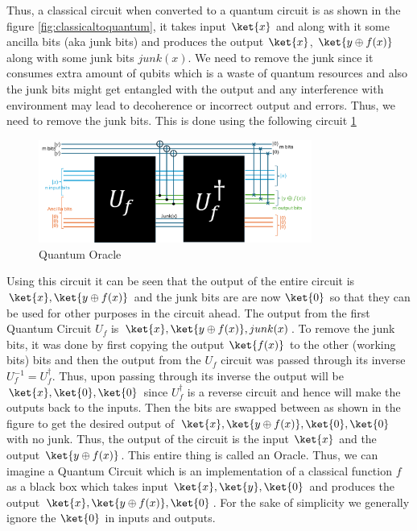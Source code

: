\documentclass[12pt, oneside]{book}
\theoremstyle{definition}
\theoremstyle{definition}
\theoremstyle{remark}
\begin{document}
Thus, a classical circuit when converted to a quantum circuit is as shown in the figure \ref{fig:classicaltoquantum}, it takes input $\ket{x}$ and along with it 
some ancilla bits (aka junk bits) and produces the output $\ket{x}$, $\ket{y \oplus f(x)}$ along with some junk bits $junk(x)$. We need to remove the junk since it consumes extra amount of qubits which is a waste of quantum resources and 
also the junk bits might get entangled with the output and any interference with environment may lead to decoherence or incorrect output and errors. Thus, we need to remove the junk bits.
This is done using the following circuit \ref{fig:quantumoracle}
\begin{figure}[H]
    \centering
    \includegraphics[width=0.8\textwidth]{../images/quantumoracle.png}
    \caption{Quantum Oracle}
    \label{fig:quantumoracle}
\end{figure}
Using this circuit it can be seen that the output of the entire circuit is $\ket{x},\ket{y\oplus f(x)}$ and the junk bits are are now $\ket{0}$ so that they can be used for other purposes in the circuit ahead. 
The output from the first Quantum Circuit $U_f$ is $\ket{x},\ket{y\oplus f(x)},junk(x)$. To remove the junk bits, it was done by first copying the output $\ket{f(x)}$ to the other (working bits) bits and then the output from the $U_f$ circuit was passed through its inverse $U_f^{-1}=U^{\dagger}_f$. Thus, upon passing through its inverse the output will be $\ket{x},\ket{0},\ket{0}$ since $U_f^{\dagger}$ is a reverse circuit and hence will make the outputs back to the inputs. 
Then the bits are swapped between as shown in the figure to get the desired output of 
$\ket{x},\ket{y\oplus f(x)},\ket{0},\ket{0}$ with no junk. Thus, the output of the circuit is the input $\ket{x}$ and the output $\ket{y\oplus f(x)}$. This entire thing is called an Oracle. 
Thus, we can imagine a Quantum Circuit which is an implementation of a classical function $f$ as a black box which takes input $\ket{x}, \ket{y},\ket{0}$ and produces the output $\ket{x},\ket{y\oplus f(x)},\ket{0}$. 
For the sake of simplicity we generally ignore the $\ket{0}$ in inputs and outputs. 
\end{document}
